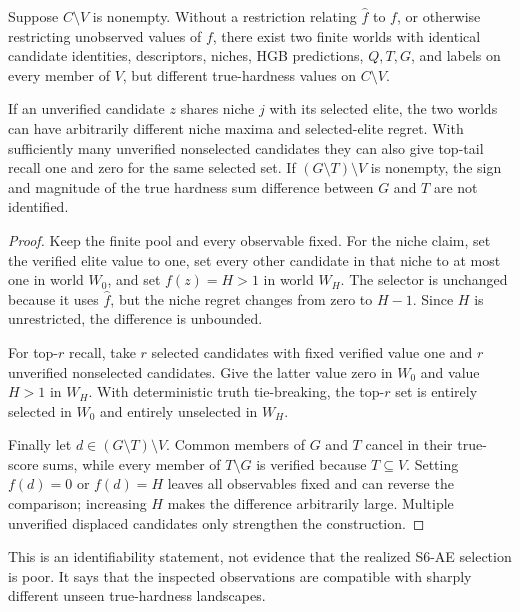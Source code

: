 \begin{proposition}
\label{prop:selective-label-impossibility}
Suppose $C\setminus V$ is nonempty.  Without a restriction relating
$\widehat f$ to $f$, or otherwise restricting unobserved values of $f$, there
exist two finite worlds with identical candidate identities, descriptors,
niches, HGB predictions, $Q,T,G$, and labels on every member of $V$, but
different true-hardness values on $C\setminus V$.

If an unverified candidate $z$ shares niche $j$ with its selected elite, the
two worlds can have arbitrarily different niche maxima and selected-elite
regret.  With sufficiently many unverified nonselected candidates they can
also give top-tail recall one and zero for the same selected set.  If
$(G\setminus T)\setminus V$ is nonempty, the sign and magnitude of the true
hardness sum difference between $G$ and $T$ are not identified.
\end{proposition}

\begin{proof}
Keep the finite pool and every observable fixed.  For the niche claim, set the
verified elite value to one, set every other candidate in that niche to at
most one in world $W_0$, and set $f(z)=H>1$ in world $W_H$.  The selector is
unchanged because it uses $\widehat f$, but the niche regret changes from zero
to $H-1$.  Since $H$ is unrestricted, the difference is unbounded.

For top-$r$ recall, take $r$ selected candidates with fixed verified value
one and $r$ unverified nonselected candidates.  Give the latter value zero in
$W_0$ and value $H>1$ in $W_H$.  With deterministic truth tie-breaking, the
top-$r$ set is entirely selected in $W_0$ and entirely unselected in $W_H$.

Finally let $d\in(G\setminus T)\setminus V$.  Common members of $G$ and $T$
cancel in their true-score sums, while every member of $T\setminus G$ is
verified because $T\subseteq V$.  Setting $f(d)=0$ or $f(d)=H$ leaves all
observables fixed and can reverse the comparison; increasing $H$ makes the
difference arbitrarily large.  Multiple unverified displaced candidates only
strengthen the construction.
\end{proof}

This is an identifiability statement, not evidence that the realized S6-AE
selection is poor.  It says that the inspected observations are compatible
with sharply different unseen true-hardness landscapes.

